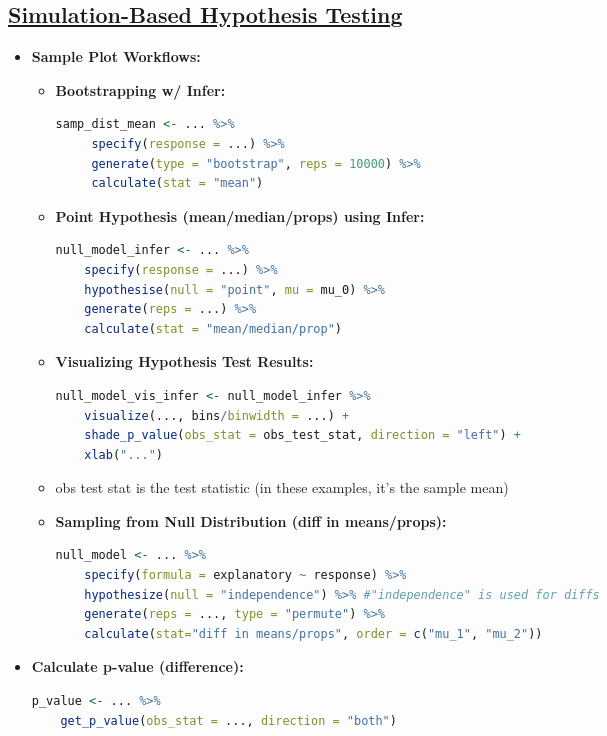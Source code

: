 \documentclass[8pt,landscape,a4paper, fleqn, dvipsnames]{extarticle}
\begin{document}
\begin{multicols*}{4}
\begin{itemize}
\section*{\ul{Simulation-Based Hypothesis Testing}}
\begin{itemize}
     \item \textbf{Sample Plot Workflows:}
    \begin{itemize}
        \item \textbf{Bootstrapping w/ Infer:}
        \begin{lstlisting}[language = R]
samp_dist_mean <- ... %>% 
     specify(response = ...) %>% 
     generate(type = "bootstrap", reps = 10000) %>% 
     calculate(stat = "mean")
        \end{lstlisting}
        \item \textbf{Point Hypothesis (mean/median/props) using Infer:}
        \begin{lstlisting}[language = R]
null_model_infer <- ... %>% 
    specify(response = ...) %>% 
    hypothesise(null = "point", mu = mu_0) %>% 
    generate(reps = ...) %>% 
    calculate(stat = "mean/median/prop")
        \end{lstlisting}
        \item \textbf{Visualizing Hypothesis Test Results:}
        \begin{lstlisting}[language = R]
null_model_vis_infer <- null_model_infer %>% 
    visualize(..., bins/binwidth = ...) + 
    shade_p_value(obs_stat = obs_test_stat, direction = "left") +
    xlab("...")
        \end{lstlisting}
        \item obs test stat is the test statistic (in these examples, it's the sample mean)
        \item \textbf{Sampling from Null Distribution (diff in means/props):}
        \begin{lstlisting}[language = R]
null_model <- ... %>% 
    specify(formula = explanatory ~ response) %>% 
    hypothesize(null = "independence") %>% #"independence" is used for diffs
    generate(reps = ..., type = "permute") %>% 
    calculate(stat="diff in means/props", order = c("mu_1", "mu_2"))    
        \end{lstlisting}
    \end{itemize}
    \item \textbf{Calculate p-value (difference):}
        \begin{lstlisting}[language = R]
p_value <- ... %>% 
    get_p_value(obs_stat = ..., direction = "both") 

\end{lstlisting}
\end{itemize}
\end{itemize}
\end{multicols*}
\end{document}
